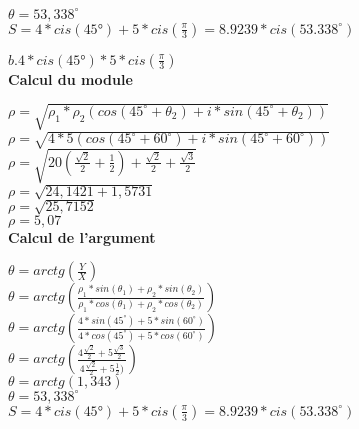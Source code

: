 $\theta = 53,338^{\circ}$ \\

$ S = 4*cis(45°) + 5*cis(\frac{\pi}{3}) = 8.9239 * cis(53.338^{\circ})$

\newpage

$b. 4*cis(45°) * 5*cis(\frac{\pi}{3})$ \\

\textbf{Calcul du module} \\
\vspace{3mm} %

$\rho = \sqrt{\rho_1*\rho_2 (cos(45^{\circ} + \theta_2)+ i* sin(45^{\circ}+ \theta_2)) }$ \\

$\rho = \sqrt{4*5 (cos(45^{\circ} + 60^{\circ})+ i* sin(45^{\circ}+ 60^{\circ})) }$ \\

$\rho = \sqrt{20  (\frac{\sqrt{2}}{2} + \frac{1}{2}) + \frac{\sqrt{2}} {2} + \frac{\sqrt{3}} {2} }$\\

$\rho = \sqrt{24,1421 + 1,5731 }$\\

$\rho = \sqrt{25,7152}$\\

$\rho = 5,07$\\

\textbf{Calcul de l'argument} \\
\vspace{3mm} %

$\theta = arctg(\frac{Y}{X})$\\

$\theta = arctg(\frac{\rho_1 * sin(\theta_1) + \rho_2 * sin(\theta_2)} {\rho_1 * cos(\theta_1) + \rho_2 * cos(\theta_2)})$ \\

$\theta = arctg(\frac{4 * sin(45^{\circ}) + 5 * sin(60^{\circ})} {4 * cos(45^{\circ}) + 5 * cos(60^{\circ})})$ \\

$\theta = arctg(\frac{4\frac{\sqrt{2}} {2} + 5\frac{\sqrt{3}} {2}} {4\frac{\sqrt{2}} {2} + 5\frac{1} {2})})$ \\

$\theta = arctg(1,343)$ \\

$\theta = 53,338^{\circ}$ \\

$ S = 4*cis(45°) + 5*cis(\frac{\pi}{3}) = 8.9239 * cis(53.338^{\circ})$ \\

